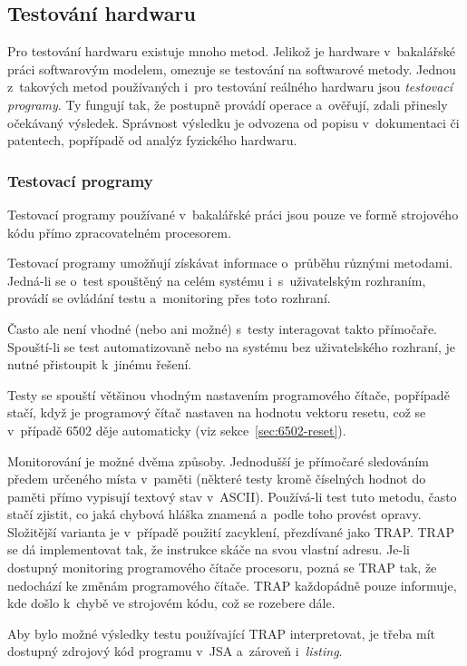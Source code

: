 \subsection{Testování hardwaru}
Pro testování hardwaru existuje mnoho metod. Jelikož je hardware v~bakalářské práci softwarovým modelem, omezuje se testování na softwarové metody. Jednou z~takových metod používaných i~pro testování reálného hardwaru jsou \emph{testovací programy}. Ty fungují tak, že postupně provádí operace a~ověřují, zdali přinesly očekávaný výsledek. Správnost výsledku je odvozena od popisu v~dokumentaci či patentech, popřípadě od analýz fyzického hardwaru.

\subsubsection{Testovací programy}
\label{sec:testovaci-programy}
Testovací programy používané v~bakalářské práci jsou pouze ve formě strojového kódu přímo zpracovatelném procesorem.

Testovací programy umožňují získávat informace o~průběhu různými metodami. Jedná-li se o~test spouštěný na celém systému i~s~uživatelským rozhraním, provádí se ovládání testu a~monitoring přes toto rozhraní.

Často ale není vhodné (nebo ani možné) s~testy interagovat takto přímočaře. Spouští-li se test automatizovaně nebo na systému bez uživatelského rozhraní, je nutné přistoupit k~jinému řešení.

Testy se spouští většinou vhodným nastavením programového čítače, popřípadě stačí, když je programový čítač nastaven na hodnotu vektoru resetu, což se v~případě 6502 děje automaticky (viz sekce~\ref{sec:6502-reset}).

Monitorování je možné dvěma způsoby. Jednodušší je přímočaré sledováním předem určeného místa v~paměti (některé testy kromě číselných hodnot do paměti přímo vypisují textový stav v~ASCII). Používá-li test tuto metodu, často stačí zjistit, co jaká chybová hláška znamená a~podle toho provést opravy. Složitější varianta je v~případě použití zacyklení, přezdívané jako TRAP. TRAP se dá implementovat tak, že instrukce skáče na svou vlastní adresu. Je-li dostupný monitoring programového čítače procesoru, pozná se TRAP tak, že nedochází ke změnám programového čítače. TRAP každopádně pouze informuje, kde došlo k~chybě ve strojovém kódu, což se rozebere dále.

Aby bylo možné výsledky testu používající TRAP interpretovat, je třeba mít dostupný zdrojový kód programu v~JSA a~zároveň i~\emph{listing}.

